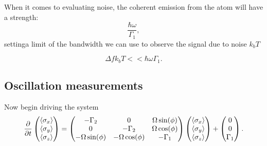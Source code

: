    
  
  
  When it comes to evaluating noise, the coherent emission from the atom will have a strength:
  \[
    \frac{\hbar\omega}{\Gamma_1},
  \]
  settinga limit of the bandwidth we can use to observe the signal due to noise $ k_bT $
   
   \[
     \Delta f k_bT<< \hbar\omega\Gamma_1.
   \]
   
  \subsection{Oscillation measurements}
  Now begin driving the system
  \begin{equation}\label{eqn:blochDriving}
     \frac{\partial}{\partial t}\begin{pmatrix}
      \left\langle \sigma_x \right\rangle\\\left\langle \sigma_y \right\rangle\\\left\langle \sigma_z \right\rangle
    \end{pmatrix} = \begin{pmatrix}
      -\Gamma_2&0&\Omega\sin(\phi)\\0&-\Gamma_2&\Omega\cos(\phi)\\-\Omega\sin(\phi)&-\Omega\cos(\phi)&-\Gamma_1\\
    \end{pmatrix}\begin{pmatrix}
      \left\langle \sigma_x \right\rangle\\\left\langle \sigma_y \right\rangle\\\left\langle \sigma_z \right\rangle
    \end{pmatrix}+\begin{pmatrix} 0\\0\\\Gamma_1
    \end{pmatrix}.
  \end{equation}
   
